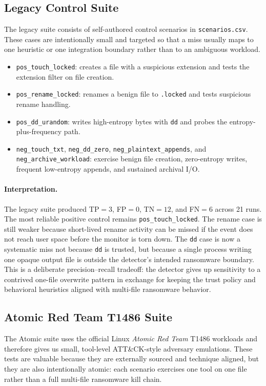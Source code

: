 \documentclass[twocolumn, 10pt]{scrartcl}
\begin{document}
\subsection{Legacy Control Suite}
The legacy suite consists of self-authored control scenarios in \texttt{scenarios.csv}. These cases are intentionally small and targeted so that a miss usually maps to one heuristic or one integration boundary rather than to an ambiguous workload.

\begin{itemize}
    \item \texttt{pos\_touch\_locked}: creates a file with a suspicious extension and tests the extension filter on file creation.
    \item \texttt{pos\_rename\_locked}: renames a benign file to \texttt{.locked} and tests suspicious rename handling.
    \item \texttt{pos\_dd\_urandom}: writes high-entropy bytes with \texttt{dd} and probes the entropy-plus-frequency path.
    \item \texttt{neg\_touch\_txt}, \texttt{neg\_dd\_zero}, \texttt{neg\_plaintext\_appends}, and \texttt{neg\_archive\_workload}: exercise benign file creation, zero-entropy writes, frequent low-entropy appends, and sustained archival I/O.
\end{itemize}

\paragraph{Interpretation.}
The legacy suite produced TP$=3$, FP$=0$, TN$=12$, and FN$=6$ across 21 runs. The most reliable positive control remains \texttt{pos\_touch\_locked}. The rename case is still weaker because short-lived rename activity can be missed if the event does not reach user space before the monitor is torn down. The \texttt{dd} case is now a systematic miss not because \texttt{dd} is trusted, but because a single process writing one opaque output file is outside the detector's intended ransomware boundary. This is a deliberate precision--recall tradeoff: the detector gives up sensitivity to a contrived one-file overwrite pattern in exchange for keeping the trust policy and behavioral heuristics aligned with multi-file ransomware behavior.

\subsection{Atomic Red Team T1486 Suite}
The Atomic suite uses the official Linux \emph{Atomic Red Team} T1486 workloads and therefore gives us small, tool-level ATT\&CK-style adversary emulations. These tests are valuable because they are externally sourced and technique aligned, but they are also intentionally atomic: each scenario exercises one tool on one file rather than a full multi-file ransomware kill chain.
\end{document}

